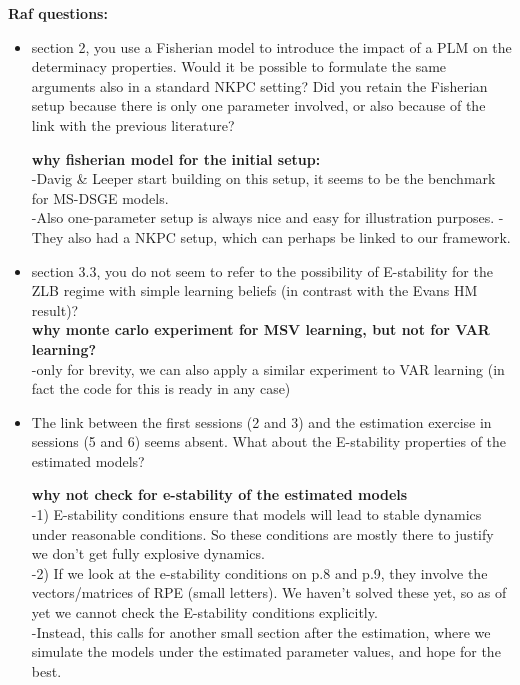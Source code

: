 \documentclass[12pt,reqno]{article}
\numberwithin{equation}{section}
\begin{document}
\textbf{Raf questions:}
\begin{itemize}
\item section 2, you use a Fisherian model to introduce the impact of a PLM on the determinacy properties. Would it be possible to formulate the same arguments also in a standard NKPC setting? Did you retain the Fisherian setup because there is only one parameter involved, or also because of the link with the previous literature?

\textbf{why fisherian model for the initial setup:}\\

-Davig \& Leeper start building on this setup, it seems to be the benchmark for MS-DSGE models. \\
-Also one-parameter setup is always nice and easy for illustration purposes. 
-They also had a NKPC setup, which can perhaps be linked to our framework. 
 
\item section 3.3, you do not seem to refer to the  possibility of E-stability for the ZLB regime with simple learning beliefs (in contrast with the Evans HM result)?\\

\textbf{why monte carlo experiment for MSV learning, but not for VAR learning? }\\

-only for brevity, we can also apply a similar experiment to VAR learning (in fact the code for this is ready in any case)\\


 
\item The link between the first sessions (2 and 3) and the estimation exercise in sessions (5 and 6) seems absent. What about the E-stability properties of the estimated models?
 
\textbf{why not check for e-stability of the estimated models} \\

-1) E-stability conditions ensure that models will lead to stable dynamics under reasonable conditions. So these conditions are mostly there to justify we don't get fully explosive dynamics.\\
-2) If we look at the e-stability conditions on p.8 and p.9, they involve the vectors/matrices of RPE (small letters). We haven't solved these yet, so as of yet we cannot check the E-stability conditions explicitly. \\
-Instead, this calls for another small section after the estimation, where we simulate the models under the estimated parameter values, and hope for the best. \\



\end{itemize}
\end{document}

